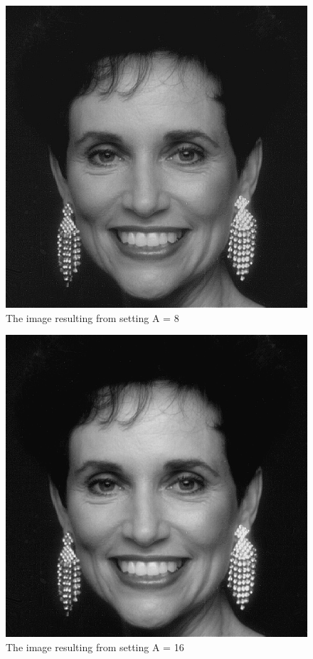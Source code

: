 \documentclass[12pt,letterpaper]{article}
\begin{document}
\begin{figure}[ht]
\centering
\includegraphics[scale=0.135]{woman/ker_a8}
\caption{\small{The image resulting from setting A = 8}
\label{fig:ker_a8} }
\end{figure}

\begin{figure}[ht]
\centering
\includegraphics[scale=0.135]{woman/ker_a16}
\caption{\small{The image resulting from setting A = 16}
\label{fig:ker_a16} }
\end{figure}
\end{document}

